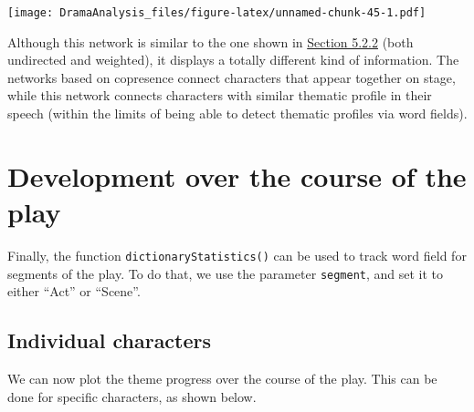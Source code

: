 \documentclass[]{book}
\newenvironment{Shaded}{\begin{snugshade}}{\end{snugshade}}
\newcommand{\DataTypeTok}[1]{\textcolor[rgb]{0.13,0.29,0.53}{#1}}
\newcommand{\DecValTok}[1]{\textcolor[rgb]{0.00,0.00,0.81}{#1}}
\newcommand{\FloatTok}[1]{\textcolor[rgb]{0.00,0.00,0.81}{#1}}
\newcommand{\KeywordTok}[1]{\textcolor[rgb]{0.13,0.29,0.53}{\textbf{#1}}}
\newcommand{\NormalTok}[1]{#1}
\newcommand{\OperatorTok}[1]{\textcolor[rgb]{0.81,0.36,0.00}{\textbf{#1}}}
\newcommand{\OtherTok}[1]{\textcolor[rgb]{0.56,0.35,0.01}{#1}}
\newcommand{\StringTok}[1]{\textcolor[rgb]{0.31,0.60,0.02}{#1}}
\begin{document}
\texttt{[image: DramaAnalysis\_files/figure-latex/unnamed-chunk-45-1.pdf]}

Although this network is similar to the one shown in \protect\hyperlink{network}{Section 5.2.2} (both undirected and weighted), it displays a totally different kind of information. The networks based on copresence connect characters that appear together on stage, while this network connects characters with similar thematic profile in their speech (within the limits of being able to detect thematic profiles via word fields).

\hypertarget{development-over-the-course-of-the-play}{%
\section{Development over the course of the play}\label{development-over-the-course-of-the-play}}

Finally, the function \texttt{dictionaryStatistics()} can be used to track word field for segments of the play. To do that, we use the parameter \texttt{segment}, and set it to either ``Act'' or ``Scene''.

\hypertarget{individual-characters}{%
\subsection{Individual characters}\label{individual-characters}}

We can now plot the theme progress over the course of the play. This can be done for specific characters, as shown below.

\begin{Shaded}
\end{Shaded}
\end{document}
